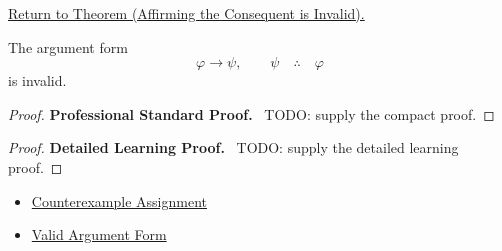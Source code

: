 \newpage
{}
\label{prf:affirming-consequent-invalid-propositional-logic}

\begin{remark*}[Return]
\hyperref[thm:affirming-consequent-invalid-propositional-logic]{Return to Theorem (Affirming the Consequent is Invalid).}
\end{remark*}

\begin{theorem*}
The argument form
\[
\varphi\to\psi,\qquad \psi \quad\therefore\quad \varphi
\]
is invalid.
\end{theorem*}

\begin{proof}
\textbf{Professional Standard Proof.}~
TODO: supply the compact proof.
\end{proof}

\begin{proof}
\textbf{Detailed Learning Proof.}~
TODO: supply the detailed learning proof.
\end{proof}

\begin{remark*}
\end{remark*}

\begin{dependencies}
\begin{itemize}
  \item \hyperref[def:counterexample-assignment-propositional-logic]{Counterexample Assignment}
  \item \hyperref[def:valid-argument-form-propositional-logic]{Valid Argument Form}
\end{itemize}
\end{dependencies}

\clearpage
